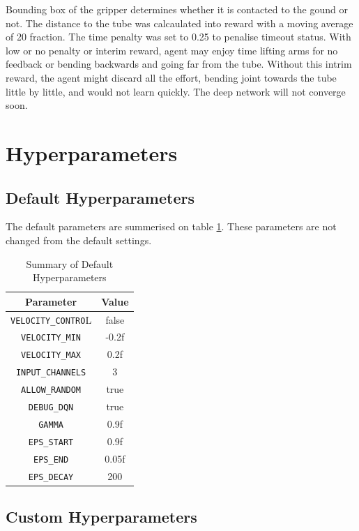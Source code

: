 \documentclass[10pt,journal,compsoc]{IEEEtran}
\begin{document}
Bounding box of the gripper determines whether it is contacted to the gound or not. The distance to the tube was calcaulated into reward with a moving average of 20 fraction. The time penalty was set to 0.25 to penalise timeout status. With low or no penalty or interim reward, agent may enjoy time lifting arms for no feedback or bending backwards and going far from the tube. Without this intrim reward, the agent might discard all the effort, bending joint towards the tube little by little, and would not learn quickly. The deep network will not converge soon.
\section{Hyperparameters}
\subsection{Default Hyperparameters}
The default parameters are summerised on table \ref{table:Default Hyperparameters}. These parameters are not changed from the default settings.
\begin{table}[ht]
      \caption{Summary of Default Hyperparameters}
      \label{table:Default Hyperparameters}
      \begin{center}
      \begin{tabular}{|c|c|}
      \hline
      Parameter & Value \\
      \hline\hline
      \verb!VELOCITY_CONTRO!L & false\\
      \hline
      \verb!VELOCITY_MIN! & -0.2f\\
      \hline
      \verb!VELOCITY_MAX! & 0.2f\\
      \hline
      \verb!INPUT_CHANNELS! & 3\\
      \hline
      \verb!ALLOW_RANDOM! & true\\
      \hline
      \verb!DEBUG_DQN! & true\\
      \hline
      \verb!GAMMA!& 0.9f\\
      \hline
      \verb!EPS_START! & 0.9f\\
      \hline
      \verb!EPS_END! & 0.05f\\
      \hline
      \verb!EPS_DECAY! & 200\\
      \hline
      \hline
      \end{tabular}
      \end{center}
\end{table}

\subsection{Custom Hyperparameters}
\end{document}
